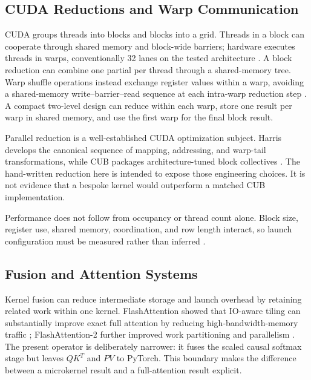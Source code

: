 \documentclass[twoside,twocolumn,10pt]{article}
\begin{document}
\subsection{CUDA Reductions and Warp Communication}

CUDA groups threads into blocks and blocks into a grid. Threads in a block can
cooperate through shared memory and block-wide barriers; hardware executes
threads in warps, conventionally 32 lanes on the tested architecture
\cite{cuda_programming_guide}. A block reduction can combine one partial per
thread through a shared-memory tree. Warp shuffle operations instead exchange
register values within a warp, avoiding a shared-memory write--barrier--read
sequence at each intra-warp reduction step \cite{cuda_warp_shuffle}. A compact
two-level design can reduce within each warp, store one result per warp in
shared memory, and use the first warp for the final block result.

Parallel reduction is a well-established CUDA optimization subject. Harris
develops the canonical sequence of mapping, addressing, and warp-tail
transformations, while CUB packages architecture-tuned block collectives
\cite{harris2007,cub_block_reduce}. The hand-written reduction here is intended
to expose those engineering choices. It is not evidence that a bespoke kernel
would outperform a matched CUB implementation.

Performance does not follow from occupancy or thread count alone. Block size,
register use, shared memory, coordination, and row length interact, so launch
configuration must be measured rather than inferred \cite{cuda_occupancy,
cuda_best_practices}.

\subsection{Fusion and Attention Systems}

Kernel fusion can reduce intermediate storage and launch overhead by retaining
related work within one kernel. FlashAttention showed that IO-aware tiling can
substantially improve exact full attention by reducing high-bandwidth-memory
traffic \cite{flashattention2022}; FlashAttention-2 further improved work
partitioning and parallelism \cite{flashattention2}. The present operator is
deliberately narrower: it fuses the scaled causal softmax stage but leaves
$QK^T$ and $PV$ to PyTorch. This boundary makes the difference between a
microkernel result and a full-attention result explicit.
\end{document}

